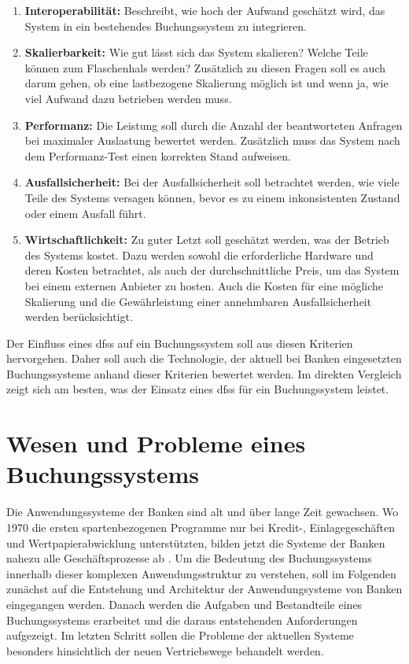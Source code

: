 \documentclass[12pt,oneside,a4paper,parskip]{scrbook}
\newcommand\blankpage{%
    \null
    \thispagestyle{empty}%
    \newpage}
\begin{document}
\begin{enumerate}
  \item \textbf{Interoperabilität:} Beschreibt, wie hoch der Aufwand geschätzt wird, das System in ein bestehendes Buchungssystem zu integrieren.
  \item \textbf{Skalierbarkeit:} Wie gut lässt sich das System skalieren? Welche Teile können zum Flaschenhals werden? Zusätzlich zu diesen Fragen soll es auch darum gehen, ob eine lastbezogene Skalierung möglich ist und wenn ja, wie viel Aufwand dazu betrieben werden muss.
  \item \textbf{Performanz:} Die Leistung soll durch die Anzahl der beantworteten Anfragen bei maximaler Auslastung bewertet werden. Zusätzlich muss das System nach dem Performanz-Test einen korrekten Stand aufweisen.
  \item \textbf{Ausfallsicherheit:} Bei der Ausfallsicherheit soll betrachtet werden, wie viele Teile des Systems versagen können, bevor es zu einem inkonsistenten Zustand oder einem Ausfall führt.
  \item \textbf{Wirtschaftlichkeit:} Zu guter Letzt soll geschätzt werden, was der Betrieb des Systems kostet. Dazu werden sowohl die erforderliche Hardware und deren Kosten betrachtet, als auch der durchschnittliche Preis, um das System bei einem externen Anbieter zu hosten. Auch die Kosten für eine mögliche Skalierung und die Gewährleistung einer annehmbaren Ausfallsicherheit werden berücksichtigt.
\end{enumerate}

Der Einfluss eines \acp{dfs} auf ein Buchungssystem soll aus diesen Kriterien hervorgehen.
Daher soll auch die Technologie, der aktuell bei Banken eingesetzten Buchungssysteme anhand dieser Kriterien bewertet werden. Im direkten Vergleich zeigt sich am besten, was der Einsatz eines \acp{dfs} für ein Buchungssystem leistet.

\afterpage{\blankpage}
\chapter{Wesen und Probleme eines Buchungssystems}
\label{bookingSystem}
Die Anwendungssysteme der Banken sind alt und über lange Zeit gewachsen. Wo 1970 die ersten spartenbezogenen Programme nur bei Kredit-, Einlagegeschäften und
Wertpapierabwicklung unterstützten, bilden jetzt die Systeme der Banken nahezu alle Ge\-schäfts\-pro\-ze\-sse ab \cite[16]{ITidF}. Um die Bedeutung des Buchungssystems innerhalb dieser komplexen Anwendungsstruktur zu verstehen, soll im Folgenden zunächst auf die Entstehung und Architektur der Anwendungsysteme von Banken eingegangen werden. Danach werden die Aufgaben und Bestandteile eines Buchungssystems erarbeitet und die daraus entstehenden Anforderungen aufgezeigt. Im letzten Schritt sollen die Probleme der aktuellen Systeme besonders hinsichtlich der neuen Vertriebswege behandelt werden. 
\label{buchungssystem}
\end{document}
